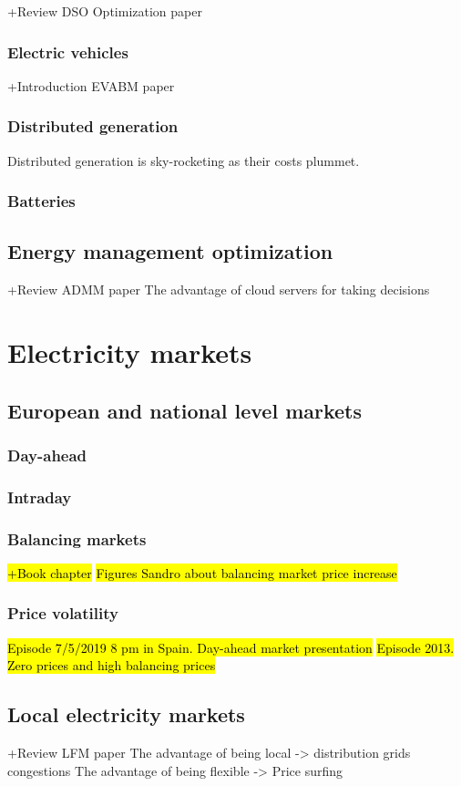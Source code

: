 +Review DSO Optimization paper
\subsubsection{Electric vehicles}
+Introduction EVABM paper
\subsubsection{Distributed generation}
Distributed generation is sky-rocketing as their costs plummet.
 
\subsubsection{Batteries}


\subsection{Energy management optimization}
+Review ADMM paper
The advantage of cloud servers for taking decisions

\section{Electricity markets}

\subsection{European and national level markets}
\subsubsection{Day-ahead}
\subsubsection{Intraday}
\subsubsection{Balancing markets}
\hl{+Book chapter}
\hl{Figures Sandro about balancing market price increase}

\subsubsection{Price volatility}
\hl{Episode 7/5/2019 8 pm in Spain. Day-ahead market presentation}
\hl{Episode 2013. Zero prices and high balancing prices}

\subsection{Local electricity markets}
+Review LFM paper
The advantage of being local -> distribution grids congestions
The advantage of being flexible -> Price surfing


